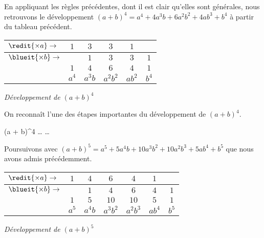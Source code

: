 \medskip

En appliquant les règles précédentes, dont il est clair qu'elles sont générales, nous retrouvons le développement $(a + b)^4 = a^4 + 4 a^3 b + 6 a^2 b^2 + 4 a b^3 + b^4$ à partir du tableau précédent.


\medskip
\begin{center}
\begin{tabular}{|l*{5}{|c}|}
	\hline
	$\redit{\times a} \rightarrow$	&
		$1$    &  $3$      &  $3$        &  $1$      &
	\\ \hline\hline
	$\blueit{\times b} \rightarrow$	&
		       &  $1$      &  $3$        &  $3$      &  $1$
	\\ \hline\hline\hline\hline
		&
		$1$    &  $4$      &  $6$        &  $4$      &  $1$
	\\ \hline
	    &
		$a^4$  &  $a^3 b$  &  $a^2 b^2$  &  $a b^2$  &  $b^4$
	\\ \hline
\end{tabular}

\smallskip
\itshape\small
Développement de $(a + b)^4$
\end{center}


\medskip

On reconnaît l'une des étapes importantes du développement de $(a + b)^4$.


\medskip

\begin{stepcalc}[style = sar]
	(a + b)^4
		\explnext{}
	\dots
		\explnext{}
		\explnext[\hideit+]{}
	\phantom{x}\kern4pt%
		\explnext{}
	\dots
\end{stepcalc}

\medskip

Poursuivons avec $(a + b)^5 = a^5 + 5 a^4 b + 10 a^3 b^2 + 10 a^2 b^3 + 5 a b^4 + b^5$ que nous avons admis précédemment.


\newpage
\begin{center}
\begin{tabular}{|l*{6}{|c}|}
	\hline
	$\redit{\times a} \rightarrow$	&
		$1$    &  $4$      &  $6$        &  $4$        &  $1$      &
	\\ \hline\hline
	$\blueit{\times b} \rightarrow$	&
		       &  $1$      &  $4$        &  $6$        &  $4$      &  $1$
	\\ \hline\hline\hline\hline
		&
		$1$    &  $5$      &  $10$       &  $10$       &  $5$      &  $1$
	\\ \hline
	    &
		$a^5$  &  $a^4 b$  &  $a^3 b^2$  &  $a^2 b^3$  &  $a b^4$  &  $b^5$
	\\ \hline
\end{tabular}

\smallskip
\itshape\small
Développement de $(a + b)^5$
\end{center}



